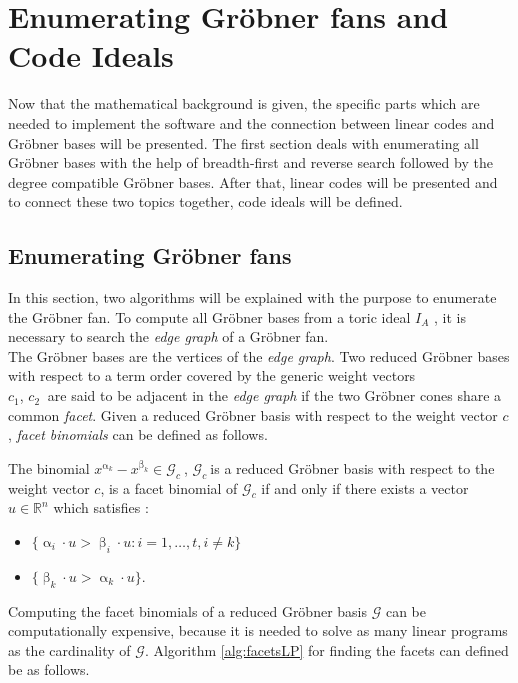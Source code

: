 
\section{Enumerating Gröbner fans and Code Ideals}
\label{sec:enumerate}

Now that the mathematical background is given, the specific parts which are needed to implement the software and the connection between linear codes and Gröbner bases will be presented. The first section deals with enumerating all Gröbner bases with the help of breadth-first and reverse search followed by the degree compatible Gröbner bases.
After that, linear codes will be presented and to connect these two topics together, code ideals will be defined. 

\subsection{Enumerating Gröbner fans}
\label{subsec:enumerate}

In this section, two algorithms will be explained with the  purpose to enumerate the Gröbner fan.
To compute all Gröbner bases from a toric ideal $I_A$ , it is necessary to search the \textit{edge graph} of a Gröbner fan.\\
The Gröbner bases are the vertices of the \textit{edge graph}.
Two reduced Gröbner bases with respect to a term order covered by the generic weight vectors \\ $c_{1}$, $c_{2}~$ are said to be adjacent in the \textit{edge graph} if the two Gröbner cones share a common \textit{facet}. Given a reduced Gröbner basis with respect to the weight vector $c$, \textit{facet binomials} can be defined as follows.

\begin{env_definition}
\cite{tigers}
The binomial $x^{\upalpha_{k}}-x^{\upbeta_k} \in \mathcal{G}_c~$, $\mathcal{G}_c~$is a reduced Gröbner basis with respect to the weight vector $c$, is a facet binomial of $\mathcal{G}_c$ if and only if there exists a vector $u \in \mathbb{R}^{n}$ which satisfies :

\begin{itemize}
\item
$ \lbrace \upalpha_{i} \cdot u > \upbeta_{i} \cdot u : i = 1, \dots , t, i \neq k \rbrace  
$
\item
$ \lbrace \upbeta_{k} \cdot u > \upalpha_{k} \cdot u \rbrace .$
\end{itemize}


\end{env_definition}
Computing the facet binomials of a reduced Gröbner basis $\mathcal{G}$ can be computationally expensive, because it is needed to solve as many linear programs as the cardinality of $\mathcal{G}$. Algorithm \ref{alg:facetsLP} for finding the facets can defined be as follows.

